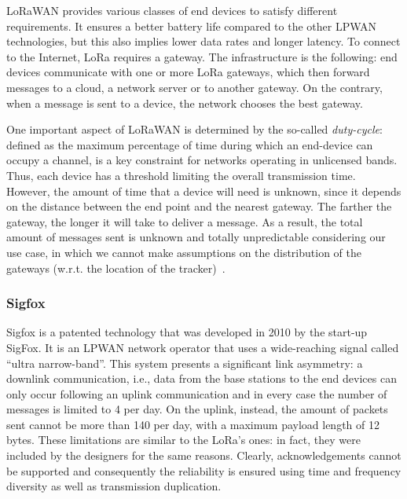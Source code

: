 LoRaWAN provides various classes of end devices to satisfy different requirements. It ensures a better battery life compared to the other LPWAN technologies, but this also implies lower data rates and longer latency. To connect to the Internet, LoRa requires a gateway. The infrastructure is the following: end devices communicate with one or more LoRa gateways, which then forward messages to a cloud, a network server or to another gateway. On the contrary, when a message is sent to a device, the network chooses the best gateway.

One important aspect of LoRaWAN is determined by the so-called \emph{duty-cycle}: defined as the maximum percentage of time during which an end-device can occupy a channel, is a key constraint for networks operating in unlicensed bands. Thus, each device has a threshold limiting the overall transmission time. However, the amount of time that a device will need is unknown, since it depends on the distance between the end point and the nearest gateway. The farther the gateway, the longer it will take to deliver a message. As a result, the total amount of messages sent is unknown and totally unpredictable considering our use case, in which we cannot make assumptions on the distribution of the gateways (w.r.t. the location of the tracker)~\cite{loralimit}.


\subsubsection{Sigfox}
Sigfox is a patented technology that was developed in 2010 by the start-up SigFox. It is an LPWAN network operator that uses a wide-reaching signal called ``ultra narrow-band''. This system presents a significant link asymmetry: a downlink communication, i.e., data from the base stations to the end devices can only occur following an uplink communication and in every case the number of messages is limited to 4 per day. On the uplink, instead, the amount of packets sent cannot be more than 140 per day, with a maximum payload length of 12 bytes. These limitations are similar to the LoRa's ones: in fact, they were included by the designers for the same reasons. Clearly, acknowledgements cannot be supported and consequently the reliability is ensured using time and frequency diversity as well as transmission duplication.

